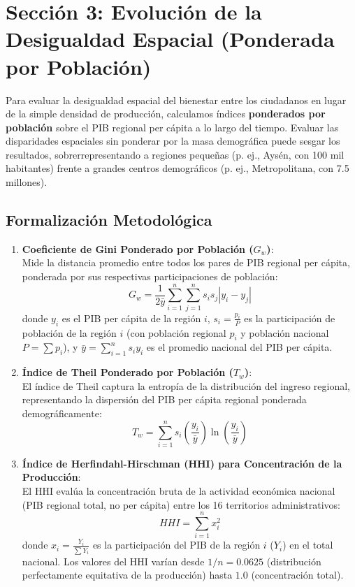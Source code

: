 \documentclass[11pt,a4paper]{article}
\begin{document}
\newpage

\section{Sección 3: Evolución de la Desigualdad Espacial (Ponderada por Población)}

Para evaluar la desigualdad espacial del bienestar entre los ciudadanos en lugar de la simple densidad de producción, calculamos índices \textbf{ponderados por población} sobre el PIB regional per cápita a lo largo del tiempo. Evaluar las disparidades espaciales sin ponderar por la masa demográfica puede sesgar los resultados, sobrerrepresentando a regiones pequeñas (p. ej., Aysén, con 100 mil habitantes) frente a grandes centros demográficos (p. ej., Metropolitana, con 7.5 millones).

\subsection{Formalización Metodológica}

\begin{enumerate}
    \item \textbf{Coeficiente de Gini Ponderado por Población ($G_w$)}:\\
    Mide la distancia promedio entre todos los pares de PIB regional per cápita, ponderada por sus respectivas participaciones de población:
    \begin{equation}
    G_w = \frac{1}{2\bar{y}} \sum_{i=1}^n \sum_{j=1}^n s_i s_j |y_i - y_j|
    \end{equation}
    donde $y_i$ es el PIB per cápita de la región $i$, $s_i = \frac{p_i}{P}$ es la participación de población de la región $i$ (con población regional $p_i$ y población nacional $P = \sum p_i$), y $\bar{y} = \sum_{i=1}^n s_i y_i$ es el promedio nacional del PIB per cápita.

    \item \textbf{Índice de Theil Ponderado por Población ($T_w$)}:\\
    El índice de Theil captura la entropía de la distribución del ingreso regional, representando la dispersión del PIB per cápita regional ponderada demográficamente:
    \begin{equation}
    T_w = \sum_{i=1}^n s_i \left( \frac{y_i}{\bar{y}} \right) \ln\left( \frac{y_i}{\bar{y}} \right)
    \end{equation}

    \item \textbf{Índice de Herfindahl-Hirschman (HHI) para Concentración de la Producción}:\\
    El HHI evalúa la concentración bruta de la actividad económica nacional (PIB regional total, no per cápita) entre los 16 territorios administrativos:
    \begin{equation}
    HHI = \sum_{i=1}^n x_i^2
    \end{equation}
    donde $x_i = \frac{Y_i}{\sum Y_i}$ es la participación del PIB de la región $i$ ($Y_i$) en el total nacional. Los valores del HHI varían desde $1/n = 0.0625$ (distribución perfectamente equitativa de la producción) hasta $1.0$ (concentración total).
\end{enumerate}
\end{document}
